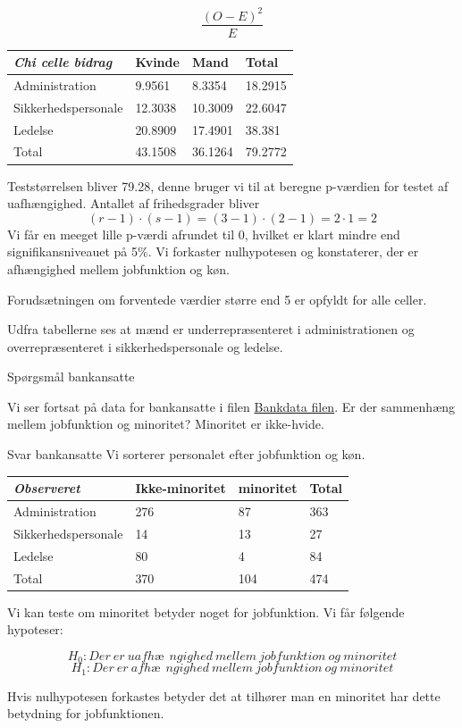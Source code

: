 \documentclass[]{book}
\begin{document}
\[\frac{(O-E)^2}{E}\]

\begin{longtable}[]{@{}llll@{}}
\toprule
\textbf{\emph{Chi celle bidrag}} & Kvinde & Mand & Total\tabularnewline
\midrule
\endhead
Administration & 9.9561 & 8.3354 & 18.2915\tabularnewline
Sikkerhedspersonale & 12.3038 & 10.3009 & 22.6047\tabularnewline
Ledelse & 20.8909 & 17.4901 & 38.381\tabularnewline
Total & 43.1508 & 36.1264 & 79.2772\tabularnewline
\bottomrule
\end{longtable}

Teststørrelsen bliver 79.28, denne bruger vi til at beregne p-værdien for testet af uafhængighed. Antallet af frihedsgrader bliver
\[(r-1)\cdot(s-1)=(3-1)\cdot(2-1)=2\cdot 1=2\]
Vi får en meeget lille p-værdi afrundet til 0, hvilket er klart mindre end signifikansniveauet på 5\%. Vi forkaster nulhypotesen og konstaterer, der er afhængighed mellem jobfunktion og køn.

Forudsætningen om forventede værdier større end 5 er opfyldt for alle celler.

Udfra tabellerne ses at mænd er underrepræsenteret i administrationen og overrepræsenteret i sikkerhedspersonale og ledelse.

Spørgsmål bankansatte

Vi ser fortsat på data for bankansatte i filen \href{https://drive.google.com/uc?export=download\&id=0B1E7VnhxsDMlRENKWWxlNlBXbmM}{Bankdata filen}. Er der sammenhæng mellem jobfunktion og minoritet? Minoritet er ikke-hvide.

Svar bankansatte
Vi sorterer personalet efter jobfunktion og køn.

\begin{longtable}[]{@{}llll@{}}
\toprule
\textbf{\emph{Observeret}} & Ikke-minoritet & minoritet & Total\tabularnewline
\midrule
\endhead
Administration & 276 & 87 & 363\tabularnewline
Sikkerhedspersonale & 14 & 13 & 27\tabularnewline
Ledelse & 80 & 4 & 84\tabularnewline
Total & 370 & 104 & 474\tabularnewline
\bottomrule
\end{longtable}

Vi kan teste om minoritet betyder noget for jobfunktion. Vi får følgende hypoteser:

\[H_0: Der\ er\ uafhæ\ \ ngighed\ mellem\ jobfunktion\ og\ minoritet\]\[H_1: Der\ er\ afhæ\ \ ngighed\ mellem\ jobfunktion\ og\ minoritet\]

Hvis nulhypotesen forkastes betyder det at tilhører man en minoritet har dette betydning for jobfunktionen.
\end{document}
